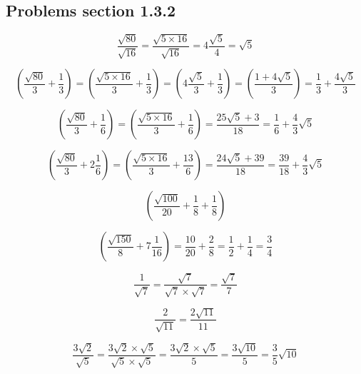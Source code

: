 \subsection{Problems section 1.3.2}


\begin{equation}
  \frac{\sqrt{80}}{\sqrt{16}} = \frac{\sqrt{5 \times 16}}{\sqrt{16}} = 4\frac{\sqrt{5}}{4} =\sqrt{5} 
\end{equation}

\begin{equation}
 \left ( \frac{\sqrt{80}}{3} + \frac{1}{3} \right) = \left ( \frac{\sqrt{5 \times 16}}{3} + \frac{1}{3} \right) = \left ( 4\frac{\sqrt{5}}{3} + \frac{1}{3} \right) = \left ( \frac{1 + 4 \sqrt{5}}{3} \right ) = \frac{1}{3} + \frac{4 \sqrt{5}}{3} 
\end{equation}

\begin{equation}
 \left ( \frac{\sqrt{80}}{3} + \frac{1}{6} \right) =  \left ( \frac{\sqrt{5 \times 16}}{3} + \frac{1}{6} \right) = \frac{25 \sqrt{5} + 3}{18} = \frac{1}{6} + \frac{4}{3}\sqrt{5}
\end{equation}

\begin{equation}
 \left (  \frac{\sqrt{80}}{3} + 2\frac{1}{6} \right ) =  \left (  \frac{\sqrt{5 \times 16}}{3} + \frac{13}{6} \right ) = \frac{24 \sqrt{5} + 39}{18} = \frac{39}{18} + \frac{4}{3} \sqrt{5}
\end{equation}

\begin{equation}
 \left (  \frac{\sqrt{100}}{20} + \frac{1}{8} + \frac{1}{8} \right )
\end{equation}

\begin{equation}
 \left (  \frac{\sqrt{150}}{8} + 7\frac{1}{16}\right ) = \frac{10}{20} + \frac{2}{8} = \frac{1}{2} + \frac{1}{4} = \frac{3}{4}
\end{equation}

\begin{equation}
  \frac{1}{\sqrt{7}} =  \frac{\sqrt{7}}{\sqrt{7} \times \sqrt{7}} = \frac{\sqrt{7}}{7}
\end{equation}

\begin{equation}
  \frac{2}{\sqrt{11}} = \frac{2 \sqrt{11}}{11}
\end{equation}

\begin{equation}
  \frac{3 \sqrt{2}}{\sqrt{5}} = \frac{3 \sqrt{2} \times \sqrt{5}}{\sqrt{5} \times \sqrt{5}} = \frac{3 \sqrt{2} \times \sqrt{5}}{5} = \frac{3 \sqrt{10}}{5} = \frac{3}{5}\sqrt{10}
\end{equation}

